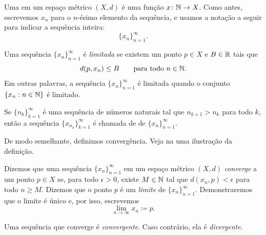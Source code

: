 \begin{defn}
Uma \emph{} em um espaço métrico $(X,d)$ é uma função
$x \colon {\mathbb{N}} \to X$. Como antes, escrevemos $x_n$ para o $n$-ésimo elemento
da sequência, e usamos a notação a seguir para indicar a sequência inteira:
\begin{equation*}
\{ x_n \}_{n=1}^\infty .
\end{equation*}

Uma sequência $\{ x_n \}_{n=1}^\infty$ é \emph{limitada}
se existem um ponto $p \in X$ e $B \in {\mathbb{R}}$ tais que
\begin{equation*}
d(p,x_n) \leq B \qquad \text{para todo } n \in {\mathbb{N}}.
\end{equation*}
Em outras palavras, a sequência $\{x_n\}_{n=1}^\infty$ é limitada quando
o conjunto $\{ x_n : n \in {\mathbb{N}} \}$
é limitado.

Se $\{ n_k \}_{k=1}^\infty$ é uma sequência de números naturais
tal que $n_{k+1} > n_k$ para todo $k$, então
a sequência $\{ x_{n_k} \}_{k=1}^\infty$
é chamada de
\emph{} de $\{x_n \}_{n=1}^\infty$.
\end{defn}

De modo semelhante, definimos convergência.
Veja na  uma ilustração
da definição.

\begin{defn}
Dizemos que uma sequência $\{ x_n \}_{n=1}^\infty$ em um espaço métrico
$(X,d)$ \emph{converge} a um ponto
$p \in X$ se, para todo $\epsilon > 0$, existe $M \in {\mathbb{N}}$ tal que
$d(x_n,p) < \epsilon$ para todo $n \geq M$. Dizemos que o ponto $p$
é um \emph{limite}
de $\{ x_n \}_{n=1}^\infty$.
Demonstraremos que o limite é único e, por isso, escrevemos
\begin{equation*}
\lim_{n\to \infty} x_n \coloneqq p .
\end{equation*}

Uma sequência que converge é \emph{convergente}.
Caso contrário, ela é \emph{divergente}.
\begin{myfigureht}
\caption{Sequência convergente a $p$. São mostrados os primeiros 10 pontos,
e $M=7$ para esse $\epsilon$.\label{fig:sequence-convergence-metric}}
\end{myfigureht}
\end{defn}

